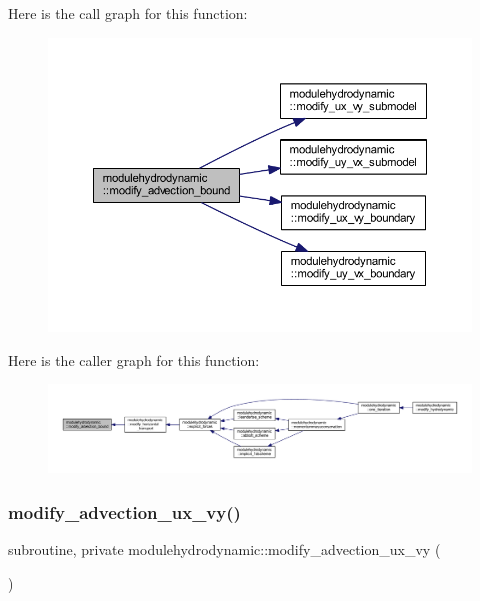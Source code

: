 Here is the call graph for this function\+:\nopagebreak
\begin{figure}[H]
\begin{center}
\leavevmode
\includegraphics[width=350pt]{namespacemodulehydrodynamic_a07085db86ddaf25769704243d0003e91_cgraph}
\end{center}
\end{figure}
Here is the caller graph for this function\+:\nopagebreak
\begin{figure}[H]
\begin{center}
\leavevmode
\includegraphics[width=350pt]{namespacemodulehydrodynamic_a07085db86ddaf25769704243d0003e91_icgraph}
\end{center}
\end{figure}
\mbox{\label{namespacemodulehydrodynamic_af43a9493ede9bd9769c3084aeeb523f8}} 
\subsubsection{\texorpdfstring{modify\+\_\+advection\+\_\+ux\+\_\+vy()}{modify\_advection\_ux\_vy()}}
{\footnotesize\ttfamily subroutine, private modulehydrodynamic\+::modify\+\_\+advection\+\_\+ux\+\_\+vy (\begin{DoxyParamCaption}{ }\end{DoxyParamCaption})\hspace{0.3cm}{\ttfamily [private]}}

